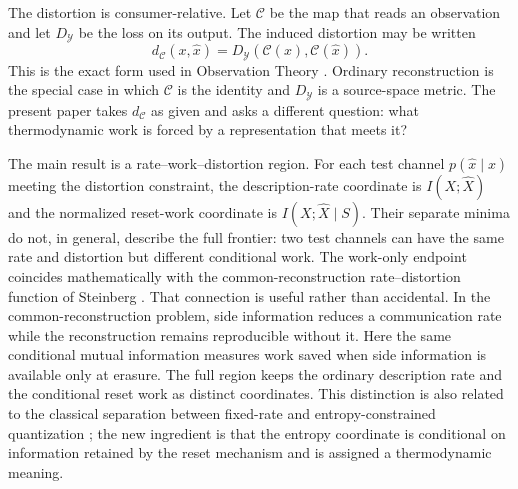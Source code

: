 \documentclass[letterpaper,onecolumn]{IEEEtran}
\theoremstyle{definition}
\theoremstyle{remark}
\newcommand{\cC}{\mathcal{C}}
\newcommand{\hX}{\widehat{X}}
\newcommand{\1}{\mathbf{1}}
\begin{document}
The distortion is consumer-relative. Let $\cC$ be the map that reads an
observation and let $D_{\mathcal Y}$ be the loss on its output. The induced
distortion may be written
\begin{equation}
 d_{\cC}(x,\hat x)
   =D_{\mathcal Y}\!\left(\cC(x),\cC(\hat x)\right).
 \label{eq:consumer-dist}
\end{equation}
This is the exact form used in Observation Theory \cite{bond2026observation}.
Ordinary reconstruction is the special case in which $\cC$ is the identity and
$D_{\mathcal Y}$ is a source-space metric. The present paper takes
$d_{\cC}$ as given and asks a different question: what thermodynamic work is
forced by a representation that meets it?

The main result is a rate--work--distortion region. For each test channel
$p(\hat x\mid x)$ meeting the distortion constraint, the description-rate
coordinate is $I(X;\hX)$ and the normalized reset-work coordinate is
$I(X;\hX\mid S)$. Their separate minima do not, in general, describe the full
frontier: two test channels can have the same rate and distortion but different
conditional work. The work-only endpoint coincides mathematically with the
common-reconstruction rate--distortion function of Steinberg
\cite{steinberg2009}. That connection is useful rather than accidental. In the
common-reconstruction problem, side information reduces a communication rate
while the reconstruction remains reproducible without it. Here the same
conditional mutual information measures work saved when side information is
available only at erasure. The full region keeps the ordinary description rate
and the conditional reset work as distinct coordinates. This distinction is
also related to the classical separation between fixed-rate and
entropy-constrained quantization \cite{chou1989,chou1990}; the new ingredient is
that the entropy coordinate is conditional on information retained by the reset
mechanism and is assigned a thermodynamic meaning.
\end{document}
